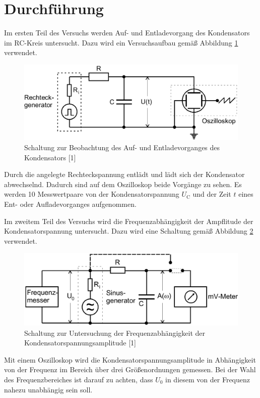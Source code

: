 \section{Durchführung}
\label{sec:Durchführung}

Im ersten Teil des Versuchs werden Auf- und Entladevorgang des Kondensators
im RC-Kreis untersucht. Dazu wird ein Versuchsaufbau gemäß Abbildung \ref{fig:aufbau1}
verwendet. 

\begin{figure}
\centering
\includegraphics[scale=0.2]{content/aufbau1.png}
\caption{Schaltung zur Beobachtung des Auf- und Entladevorganges des Kondensators [1]}
\label{fig:aufbau1}
\end{figure}

Durch die angelegte Rechteckspannung entlädt und lädt sich der Kondensator 
abwechselnd. 
Dadurch sind auf dem Oszilloskop beide Vorgänge zu sehen. Es werden
10 Messwertpaare von der Kondensatorspannung $U_\text{C}$ und der Zeit $t$ eines Ent- oder
Aufladevorganges aufgenommen.

Im zweitem Teil des Versuchs wird die Frequenzabhängigkeit der Ampflitude der 
Kondensatorspannung untersucht. Dazu wird eine Schaltung gemäß Abbildung \ref{fig:aufbau2}
verwendet. 

\begin{figure}
\centering
\includegraphics[scale=0.2]{content/aufbau2.png}
\caption{Schaltung zur Untersuchung der Frequenzabhängigkeit der Kondensatorspannungsamplitude [1]}
\label{fig:aufbau2}
\end{figure}

Mit einem Oszilloskop wird die Kondensatorspannungsamplitude in Abhängigkeit von 
der Frequenz im Bereich über drei Größenordnungen gemessen. Bei der Wahl des 
Frequenzbereiches ist darauf zu achten, dass $U_0$ in diesem von der Frequenz 
nahezu unabhängig sein soll. 

